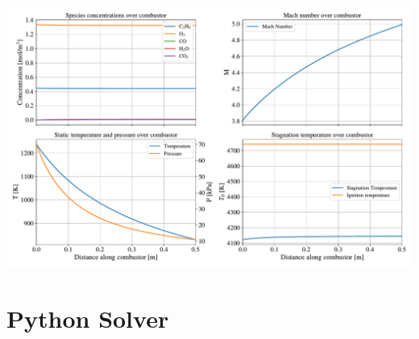 \documentclass[a4paper]{article}
\begin{document}
\begin{widefigure}[20mm]
    \centering
    \includegraphics[width=\linewidth]{part_2_img/subfig_1238.pdf}
    \caption{Properties over combustion at \SI{1237.63}{\K}}
    \label{fig:properties_1238}
\end{widefigure}

\newpage
\section{Python Solver}\label{app:code}
\inputminted{python}{code/part2IncludingN2.py}
\end{document}
